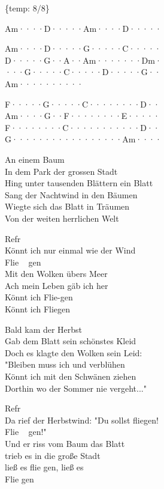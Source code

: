 \documentclass[
  letterpaper,
  twoside=false]{scrbook}
\begin{document}
\{temp: 8/8\}

Am····\textbar D·····\textbar Am····\textbar D·····\textbar{}

Am····\textbar D·····\textbar G·····\textbar C·····\textbar{}\\
D·····\textbar G··A··\textbar Am····\textbar···Dm·\textbar{}\\
···G··\textbar···C··\textbar···D··\textbar···G··\textbar{}\\
Am····\textbar······\textbar{}

F·····\textbar G·····\textbar C·····\textbar···D··\textbar{}\\
Am····\textbar G··F··\textbar······\textbar E·····\textbar{}\\
F·····\textbar···C··\textbar······\textbar···D··\textbar{}\\
G·····\textbar······\textbar······\textbar Am····\textbar{}

An einem Baum\\
In dem Park der grossen Stadt\\
Hing unter tausenden Blättern ein Blatt\\
Sang der Nachtwind in den Bäumen\\
Wiegte sich das Blatt in Träumen\\
Von der weiten herrlichen Welt

Refr\\
Könnt ich nur einmal wie der Wind\\
Flie ~ gen\\
Mit den Wolken übers Meer\\
Ach mein Leben gäb ich her\\
Könnt ich Flie-gen\\
Könnt ich Fliegen

Bald kam der Herbst\\
Gab dem Blatt sein schönstes Kleid\\
Doch es klagte den Wolken sein Leid:\\
"Bleiben muss ich und verblühen\\
Könnt ich mit den Schwänen ziehen\\
Dorthin wo der Sommer nie vergeht..."

Refr\\
Da rief der Herbstwind: "Du sollst fliegen!\\
Flie ~ gen!"\\
Und er riss vom Baum das Blatt\\
trieb es in die große Stadt\\
ließ es flie gen, ließ es\\
Flie gen
\end{document}
